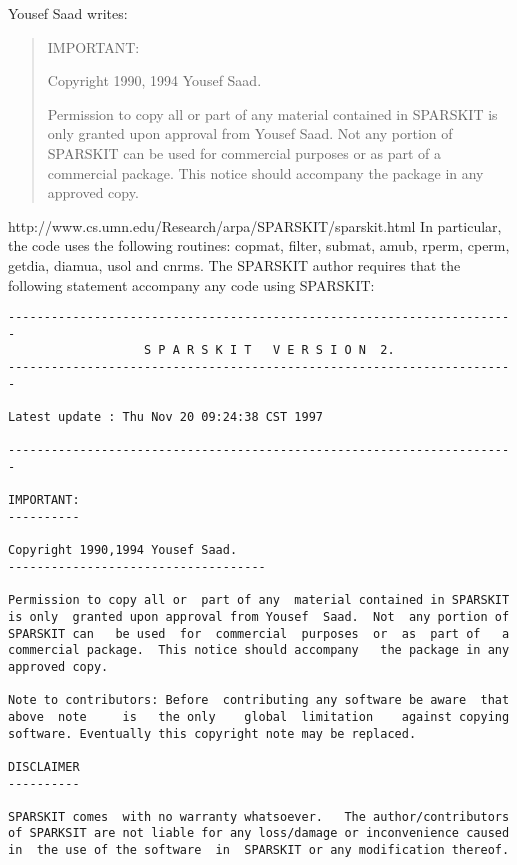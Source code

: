 \documentclass[12pt]{article}
\begin{document}
Yousef Saad writes:
\begin{quote}
  IMPORTANT: 


Copyright 1990, 1994 Yousef Saad.

Permission to copy all or  part of any  material contained in SPARSKIT
is only  granted upon approval from Yousef  Saad.  Not  any portion of
SPARSKIT can   be used  for  commercial  purposes  or  as  part of   a
commercial package.  This notice should accompany   the package in any
approved copy.



\end{quote}




 http://www.cs.umn.edu/Research/arpa/SPARSKIT/sparskit.html
In particular, the code uses the following routines:
copmat, filter, submat, amub, rperm, cperm, getdia, diamua, usol and cnrms.
The SPARSKIT author requires that the 
following statement accompany any code using SPARSKIT:

\begin{verbatim}
-----------------------------------------------------------------------
                   S P A R S K I T   V E R S I O N  2.
----------------------------------------------------------------------- 

Latest update : Thu Nov 20 09:24:38 CST 1997

-----------------------------------------------------------------------

IMPORTANT: 
---------- 

Copyright 1990,1994 Yousef Saad.
------------------------------------ 

Permission to copy all or  part of any  material contained in SPARSKIT
is only  granted upon approval from Yousef  Saad.  Not  any portion of
SPARSKIT can   be used  for  commercial  purposes  or  as  part of   a
commercial package.  This notice should accompany   the package in any
approved copy.

Note to contributors: Before  contributing any software be aware  that
above  note     is   the only    global  limitation    against copying
software. Eventually this copyright note may be replaced.

DISCLAIMER
----------

SPARSKIT comes  with no warranty whatsoever.   The author/contributors
of SPARKSIT are not liable for any loss/damage or inconvenience caused
in  the use of the software  in  SPARSKIT or any modification thereof.


\end{verbatim}
\end{document}
